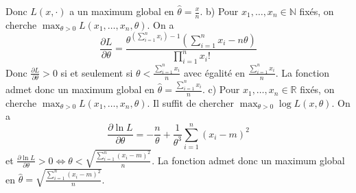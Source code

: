 \documentclass{report}
\begin{document}
Donc $L(x,\cdot)$ a un maximum global en $\hat \theta=\frac{x}{n}$.\newline 
\newline
b) Pour $x_1,\ldots, x_n\in \mathbb N$ fixés, on cherche $\displaystyle \max_{\theta > 0} L(x_1,\ldots,x_n,\theta)$. On a $$\frac{\partial L}{\partial \theta} = \frac{\theta^{(\sum_{i=1}^nx_i) -1 }\left(\sum_{i=1}^nx_i - n\theta  \right)}{\prod_{i=1}^n x_i!}$$
Donc $\frac{\partial L}{\partial \theta} >0$ si et seulement si $\theta <\frac{\sum_{i=1}^n x_i}{n}$ avec égalité en $\frac{\sum_{i=1}^n x_i}{n}$. \newline
La fonction admet donc un maximum global en $\displaystyle \hat{\theta} = \frac{\sum_{i=1}^n x_i}{n}$.\newline 
\newline 
c) Pour $x_1,\ldots, x_n\in \mathbb R$ fixés, on cherche $\displaystyle \max_{\theta > 0} L(x_1,\ldots,x_n,\theta)$. Il suffit de chercher $\max_{\theta >0}\log L(x,\theta)$. On a $$\frac{\partial\ln L}{\partial \theta}= -\frac{n}{\theta} + \frac{1}{\theta^3}\sum_{i=1}^n(x_i-m)^2$$
et $\frac{\partial\ln L}{\partial \theta}>0 \iff \theta < \sqrt{\frac{\sum_{i=1}^n (x_i-m)^2}{n}} $. \newline
La fonction admet donc un maximum global en $\displaystyle \hat{\theta} = \sqrt{\frac{\sum_{i=1}^n (x_i-m)^2}{n}}$.\newline
\end{document}

